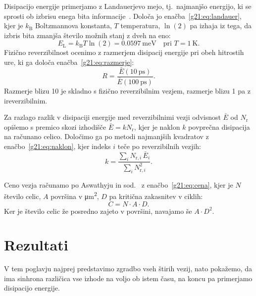 Disipacijo energije primerjamo z Landauerjevo mejo, tj.\ najmanjšo energijo, ki se sprosti ob izbrisu enega bita informacije~\cite{landauer1961}. Določa jo enačba~\eqref{g21:eq:landauer}, kjer je $k_\mathrm{B}$ Boltzmannova konstanta, $T$ temperatura, $\ln(2)$ pa izhaja iz tega, da izbris bita zmanjša število možnih stanj z dveh na eno:
\begin{equation}
E_\mathrm{L} = k_\mathrm{B} T \ln(2) = \SI{0.0597}{\milli\electronvolt} \quad \text{pri } T = \SI{1}{\kelvin}.
\label{g21:eq:landauer}
\end{equation}
Fizično reverzibilnost ocenimo z razmerjem disipacij energije pri obeh hitrostih ure, ki ga določa enačba~\eqref{g21:eq:razmerje}:
\begin{equation}
R = \frac{\bar{E}(\SI{10}{\pico\second})}{\bar{E}(\SI{100}{\pico\second})}.
\label{g21:eq:razmerje}
\end{equation}
Razmerje blizu 10 je skladno s fizično reverzibilnim vezjem, razmerje blizu 1 pa z ireverzibilnim.

Za razlago razlik v disipaciji energije med reverzibilnimi vezji odvisnost $\bar{E}$ od $N_\mathrm{r}$ opišemo s premico skozi izhodišče $\bar{E} = k N_\mathrm{r}$, kjer je naklon $k$ povprečna disipacija na računano celico. Določimo ga po metodi najmanjših kvadratov z enačbo~\eqref{g21:eq:naklon}, kjer indeks $i$ teče po reverzibilnih vezjih:
\begin{equation}
k = \frac{\sum_i N_{\mathrm{r},i}\,\bar{E}_i}{\sum_i N_{\mathrm{r},i}^2}.
\label{g21:eq:naklon}
\end{equation}

Ceno vezja računamo po Aswathyju in sod.~\cite{g21:aswathy2024} z enačbo~\eqref{g21:eq:cena}, kjer je $N$ število celic, $A$ površina v \si{\micro\metre\squared}, $D$ pa kritična zakasnitev v ciklih:
\begin{equation}
C = N \cdot A \cdot D.
\label{g21:eq:cena}
\end{equation}
Ker je število celic že posredno zajeto v površini, navajamo še $A \cdot D^2$.

\section{Rezultati}
\label{g21:sec:rezultati}

V tem poglavju najprej predstavimo zgradbo vseh štirih vezij, nato pokažemo, da ima sinhrona različica vse izhode na voljo ob istem času, na koncu pa primerjamo disipacijo energije.

